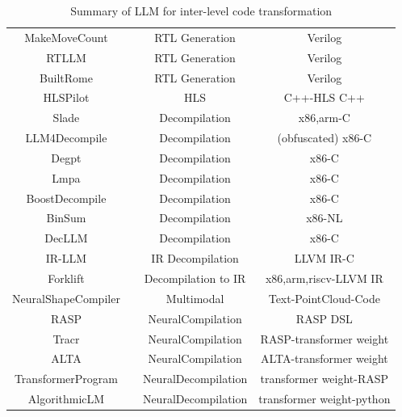 \documentclass[pdflatex,sn-mathphys-ay,twocolumn, a4paper]{sn-jnl}%
\theoremstyle{thmstyleone}%
\theoremstyle{thmstyletwo}%
\theoremstyle{thmstylethree}%
\begin{document}
\begin{table}
{\begin{tabular}{|c|c|c|c|}
    MakeMoveCount & \citet{111_delorenzo2024make} & RTL Generation & Verilog \\
    RTLLM & \citet{114_lu2024rtllm} & RTL Generation & Verilog \\
    BuiltRome & \citet{120_nakkab2024rome} & RTL Generation & Verilog \\
    
    HLSPilot & \citet{98_xiong2024hlspilot} & HLS & C++-HLS C++ \\
    \hline
    Slade & \citet{72_armengol2024slade} & Decompilation & x86,arm-C \\
    LLM4Decompile & \citet{73_tan-etal-2024-llm4decompile} & Decompilation & (obfuscated) x86-C \\
    Degpt & \citet{75_hu2024degpt} & Decompilation & x86-C \\
    Lmpa & \citet{130_xu2023lmpa} & Decompilation & x86-C \\
    BoostDecompile & \citet{155_cao2022boosting} & Decompilation & x86-C \\
    BinSum & \citet{129_binsum2023_arxiv} & Decompilation & x86-NL \\
    DecLLM & \citet{173_wong2025decllm} & Decompilation & x86-C \\
    IR-LLM & \citet{13_jiang2025can} & IR Decompilation & LLVM IR-C \\
    Forklift & \citet{169_armengol-estape2024forklift} & Decompilation to IR & x86,arm,riscv-LLVM IR \\
    \hline
    NeuralShapeCompiler & \citet{145_luo2023neural} & Multimodal & Text-PointCloud-Code \\

    RASP & \citet{165_weiss2021thinking} & NeuralCompilation & RASP DSL  \\
    Tracr & \citet{132_lindner2023tracr} & NeuralCompilation & RASP-transformer weight \\
    ALTA & \citet{83_shaw2025alta} & NeuralCompilation & ALTA-transformer weight \\
    TransformerProgram & \citet{143_friedman2023learning} & NeuralDecompilation & transformer weight-RASP \\
    AlgorithmicLM & \citet{20_saldyt2025algorithmiclanguagemodelsneurally} & NeuralDecompilation & transformer weight-python \\
    \hline
    \end{tabular}
    }
    \caption{Summary of LLM for inter-level code transformation}
    \label{tab:inter-level}
\end{table}
\end{document}
